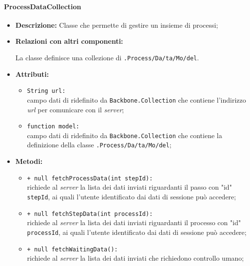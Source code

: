 \paragraph{ProcessDataCollection}
\label{processDataCollection}
\begin{flushleft}
\begin{itemize}
\item \textbf{Descrizione:} Classe che permette di gestire un insieme di processi;
\item \textbf{Relazioni con altri componenti:}
\begin{sloppypar}
La classe definisce una collezione di \texttt{\model{}.Process\fshyp{}Da\fshyp{}ta\fshyp{}Mo\fshyp{}del}.
\end{sloppypar}
\item \textbf{Attributi:}
\begin{sloppypar}
\begin{itemize}
\item \texttt{String url:}\\ campo dati di ridefinito da \texttt{Backbone.Collection} che contiene l'indirizzo \textit{url} per comunicare con il \textit{server};
\item \texttt{function model:}\\ campo dati di ridefinito da \texttt{Backbone.Collection} che contiene la definizione della classe \texttt{\model{}.Process\fshyp{}Da\fshyp{}ta\fshyp{}Mo\fshyp{}del};
\end{itemize}
\end{sloppypar}
\item \textbf{Metodi:}
\begin{sloppypar}
\begin{itemize}
\item \texttt{+ null fetchProcessData(int stepId):}\\ richiede al \textit{server} la lista dei dati inviati riguardanti il passo con "id" \texttt{stepId}, ai quali l'utente identificato dai dati di sessione può accedere;
\item \texttt{+ null fetchStepData(int processId):}\\ richiede al \textit{server} la lista dei dati inviati riguardanti il processo con "id" \texttt{processId}, ai quali l'utente identificato dai dati di sessione può accedere;
\item \texttt{+ null fetchWaitingData():}\\ richiede al \textit{server} la lista dei dati inviati che richiedono controllo umano;

\end{itemize}
\end{sloppypar}
\end{itemize}
\end{flushleft}
